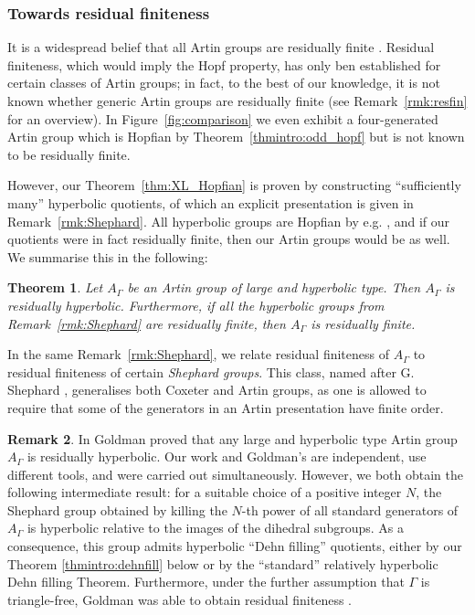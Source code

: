 \documentclass[svgnames]{amsart}
\theoremstyle{plain}
\newtheorem{thmintro}{Theorem}
\theoremstyle{definition}
\newtheorem{remintro}[thmintro]{Remark}
\begin{document}
\subsubsection*{Towards residual finiteness}
It is a widespread belief that all Artin groups are residually finite \cite[Problem 8.05]{aim}. Residual finiteness, which would imply the Hopf property, has only ben established for certain classes of Artin groups; in fact, to the best of our knowledge, it is not known whether generic Artin groups are residually finite (see Remark~\ref{rmk:resfin} for an overview). In Figure~\ref{fig:comparison} we even exhibit a four-generated Artin group which is Hopfian by Theorem~\ref{thmintro:odd_hopf} but is not known to be residually finite.

However, our Theorem~\ref{thm:XL_Hopfian} is proven by constructing “sufficiently many” hyperbolic quotients, of which an explicit presentation is given in Remark~\ref{rmk:Shephard}. All hyperbolic groups are Hopfian by e.g. \cite[Corollary 6.13]{ReinfeldWeidmann}, and if our quotients were in fact residually finite, then our Artin groups would be as well. We summarise this in the following:

\begin{thmintro}\label{thmintro:artin_reshyp}
    Let $A_\Gamma$ be an Artin group of large and hyperbolic type. Then $A_\Gamma$ is residually hyperbolic. Furthermore, if all the hyperbolic groups from Remark~\ref{rmk:Shephard} are residually finite, then $A_\Gamma$ is residually finite.
\end{thmintro}

In the same Remark~\ref{rmk:Shephard}, we relate residual finiteness of $A_\Gamma$ to residual finiteness of certain \emph{Shephard groups}. This class, named after G. Shephard \cite{shephard}, generalises both Coxeter and Artin groups, as one is allowed to require that some of the generators in an Artin presentation have finite order. 

\begin{remintro}\label{rem:comparison with goldman}
In \cite{goldman20242dimensionalshephardgroups} Goldman proved that any large and hyperbolic type Artin group $A_\Gamma$ is residually hyperbolic. Our work and Goldman's are independent, use different tools, and were carried out simultaneously. However, we both obtain the following intermediate result: for a suitable choice of a positive integer $N$, the Shephard group obtained by killing the $N$-th power of all standard generators of $A_\Gamma$ is hyperbolic relative to the images of the dihedral subgroups. As a consequence, this group admits hyperbolic ``Dehn filling'' quotients, either by our Theorem \ref{thmintro:dehnfill} below or by the ``standard'' relatively hyperbolic Dehn filling Theorem. Furthermore, under the further assumption that $\Gamma$ is triangle-free, Goldman was able to obtain residual finiteness \cite[Corollary G]{goldman20242dimensionalshephardgroups}. 
\end{remintro}
\end{document}
